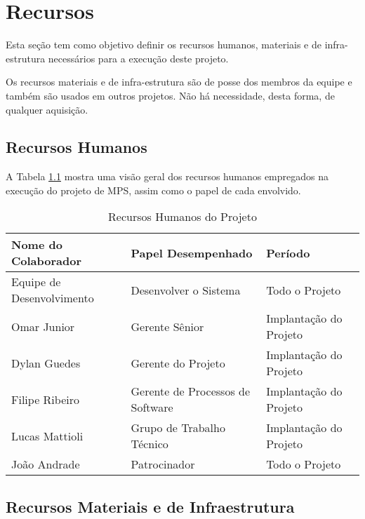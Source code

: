 \chapter[Recursos]{Recursos}

Esta seção tem como objetivo definir os recursos humanos, materiais e de infra-estrutura necessários para a execução deste projeto. 

Os recursos materiais e de infra-estrutura são de posse dos membros da equipe e também são usados em outros projetos. Não há necessidade, desta forma, de qualquer aquisição. 

\section{Recursos Humanos}

A Tabela \ref{recursos-humanos-do-projeto} mostra uma visão geral dos recursos humanos empregados na execução do projeto de MPS, assim como o papel de cada envolvido.

\begin{table}[h!]
\centering
\caption{Recursos Humanos do Projeto}
\label{recursos-humanos-do-projeto}
\begin{tabular}{|l|l|l|}
\hline
\textbf{Nome do Colaborador} & \textbf{Papel Desempenhado}      & \textbf{Período}       \\ \hline
Equipe de Desenvolvimento    & Desenvolver o Sistema            & Todo o Projeto         \\ \hline
Omar Junior                  & Gerente Sênior                   & Implantação do Projeto \\ \hline
Dylan Guedes                 & Gerente do Projeto               & Implantação do Projeto \\ \hline
Filipe Ribeiro               & Gerente de Processos de Software & Implantação do Projeto \\ \hline
Lucas Mattioli               & Grupo de Trabalho Técnico        & Implantação do Projeto \\ \hline
João Andrade                 & Patrocinador                     & Todo o Projeto         \\ \hline
\end{tabular}
\end{table}

\section{Recursos Materiais e de Infraestrutura}

